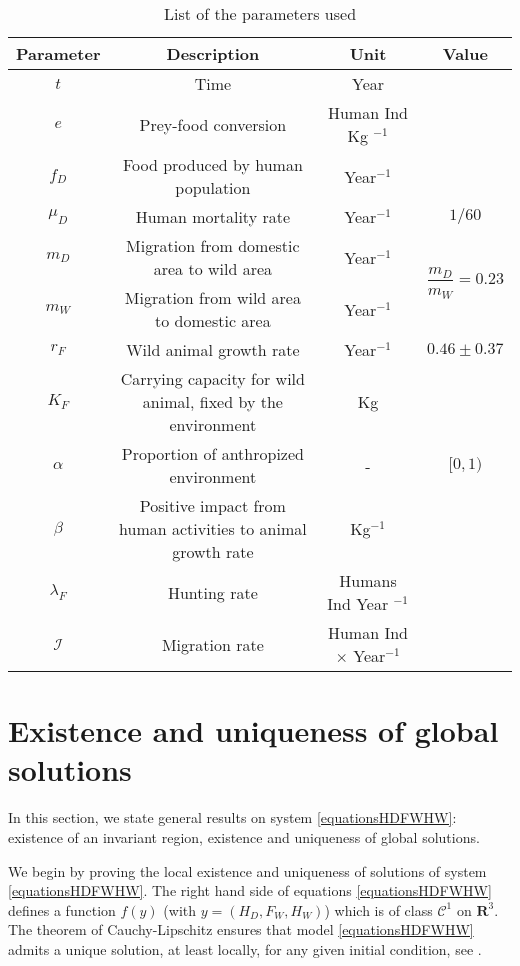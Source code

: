 \documentclass{article}
\newcommand{\lfw}{\lambda_{F}}
\newcommand{\lfw}{\lambda_{F}}
\begin{document}
\begin{table}
\centering
\begin{tabular}{|c|c|c|c|}
\hline 
Parameter & Description & Unit & Value \\ 
\hline 
$t$ & Time & Year \\
$e$ & Prey-food conversion & Human Ind Kg $^{-1}$ & \\
$f_D$ & Food produced by human population & Year$^{-1}$\\
$\mu_D$ & Human mortality rate  & Year$^{-1}$ & $1/60$\\
$m_D$ & Migration from domestic area to wild area & Year$^{-1}$ & \multirow{2}{*}{$\dfrac{m_D}{m_W} = 0.23$}\\
$m_W$ & Migration from wild area to domestic area & Year$^{-1}$\\
$r_F$ & Wild animal growth rate & Year$^{-1}$ & $0.46 \pm 0.37$\\
$K_F$ & Carrying capacity for wild animal, fixed by the environment& Kg\\
$\alpha$ & Proportion of anthropized environment & - & $[0, 1)$\\
$\beta$ & Positive impact from human activities to animal growth rate & Kg$^{-1}$ & \\
$\lfw$ & Hunting rate & Humans Ind Year $^{-1}$ \\
$\mathcal{I}$ & Migration rate & Human Ind $\times$ Year$^{-1}$ \\
\hline
\end{tabular}
\caption{List of the parameters used}
\end{table}

\section{Existence and uniqueness of global solutions}
In this section, we state general results on system \eqref{equationsHDFWHW}:  existence of an invariant region, existence and uniqueness of global solutions.

We begin by proving the local existence and uniqueness of solutions of system \eqref{equationsHDFWHW}. The right hand side of equations \eqref{equationsHDFWHW} defines a function $f(y)$ (with $y = (H_D, F_W, H_W)$) which is of class $\mathcal{C}^1$ on $\mathbf{R}^3$. The theorem of Cauchy-Lipschitz ensures that model \eqref{equationsHDFWHW} admits a unique solution, at least locally, for any given initial condition, see \cite{walter_ordinary_1998}.
\end{document}
